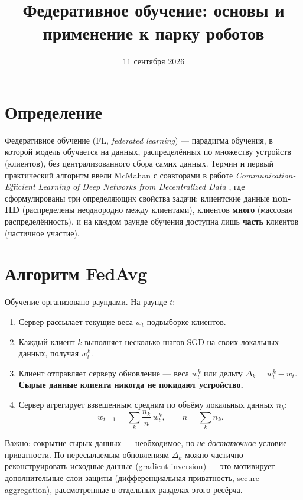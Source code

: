 \documentclass[11pt]{article}
\title{Федеративное обучение: основы и применение к парку роботов}
\author{}
\date{11 сентября 2026}
\begin{document}
\maketitle

\section{Определение}

Федеративное обучение (FL, \emph{federated learning}) — парадигма обучения, в которой
модель обучается на данных, распределённых по множеству устройств (клиентов), без
централизованного сбора самих данных. Термин и первый практический алгоритм ввели McMahan с соавторами в работе
\emph{Communication-Efficient Learning of Deep Networks from Decentralized Data}
\cite{mcmahan2017}, где сформулированы три
определяющих свойства задачи: клиентские данные \textbf{non-IID} (распределены
неоднородно между клиентами), клиентов \textbf{много} (массовая распределённость), и
на каждом раунде обучения доступна лишь \textbf{часть} клиентов (частичное участие).

\section{Алгоритм FedAvg}

Обучение организовано раундами. На раунде $t$:
\begin{enumerate}
  \item Сервер рассылает текущие веса $w_t$ подвыборке клиентов.
  \item Каждый клиент $k$ выполняет несколько шагов SGD на своих локальных данных,
        получая $w_t^k$.
  \item Клиент отправляет серверу обновление — веса $w_t^k$ или дельту
        $\Delta_k = w_t^k - w_t$. \textbf{Сырые данные клиента никогда не покидают
        устройство.}
  \item Сервер агрегирует взвешенным средним по объёму локальных данных $n_k$:
        \[
          w_{t+1} = \sum_{k} \frac{n_k}{n} \, w_t^k, \qquad n = \sum_k n_k.
        \]
\end{enumerate}

Важно: сокрытие сырых данных — необходимое, но \emph{не достаточное} условие
приватности. По пересылаемым обновлениям $\Delta_k$ можно частично реконструировать
исходные данные (gradient inversion) — это мотивирует дополнительные слои защиты
(дифференциальная приватность, secure aggregation), рассмотренные в отдельных
разделах этого ресёрча.
\end{document}
